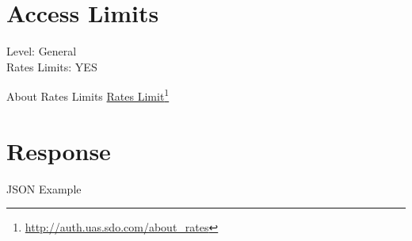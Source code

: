 \section{Access Limits}
\label{accesslimits}

Level: General\\
Rates Limits: YES 

About Rates Limits \href{http://auth.uas.sdo.com/about_rates}{Rates Limit}\footnote{\href{http://auth.uas.sdo.com/about_rates}{http:/\slash auth.uas.sdo.com\slash about\_rates}}

\section{Response}
\label{response}

JSON Example 

